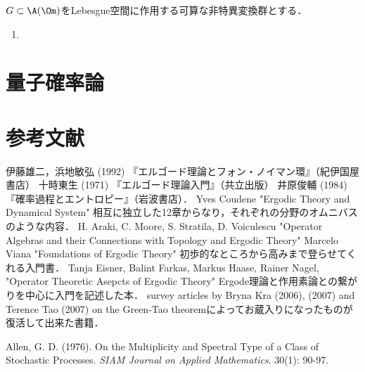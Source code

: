 \documentclass[uplatex,dvipdfmx]{jsreport}
\begin{document}
\begin{definition}
    $G\subset\A(\Om)$をLebesgue空間に作用する可算な非特異変換群とする．
    \begin{enumerate}
        \item 
    \end{enumerate}
\end{definition}

\chapter{量子確率論}

\chapter{参考文献}

\begin{thebibliography}{99}
    伊藤雄二，浜地敏弘 (1992) 『エルゴード理論とフォン・ノイマン環』（紀伊国屋書店）
    十時東生 (1971) 『エルゴード理論入門』（共立出版）
    井原俊輔 (1984) 『確率過程とエントロピー』（岩波書店）．
    Yves Coudene "Ergodic Theory and Dynamical System"
    相互に独立した12章からなり，それぞれの分野のオムニバスのような内容．
    H. Araki, C. Moore, S. Stratila, D. Voiculescu "Operator Algebras and their Connections with Topology and Ergodic Theory"
    Marcelo Viana "Foundations of Ergodic Theory"
    初歩的なところから高みまで登らせてくれる入門書．
    Tanja Eisner, Balint Farkas, Markus Haase, Rainer Nagel, "Operator Theoretic Asepcts of Ergodic Theory"
    Ergode理論と作用素論との繋がりを中心に入門を記述した本．
    survey articles by Bryna Kra (2006), (2007) and Terence Tao (2007) on the Green-Tao theoremによってお蔵入りになったものが復活して出来た書籍．

    Allen, G. D. (1976). On the Multiplicity and Spectral Type of a Class of Stochastic Processes. \textit{SIAM Journal on Applied Mathematics}. 30(1): 90-97.
\end{thebibliography}
\end{document}
